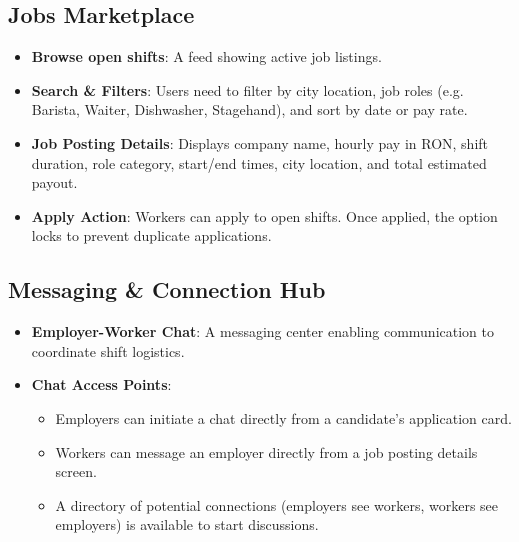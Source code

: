\documentclass{article}
\begin{document}
\subsection{Jobs Marketplace}
\begin{itemize}
    \item \textbf{Browse open shifts}: A feed showing active job listings.
    \item \textbf{Search \& Filters}: Users need to filter by city location, job roles (e.g. Barista, Waiter, Dishwasher, Stagehand), and sort by date or pay rate.
    \item \textbf{Job Posting Details}: Displays company name, hourly pay in RON, shift duration, role category, start/end times, city location, and total estimated payout.
    \item \textbf{Apply Action}: Workers can apply to open shifts. Once applied, the option locks to prevent duplicate applications.
\end{itemize}

\subsection{Messaging \& Connection Hub}
\begin{itemize}
    \item \textbf{Employer-Worker Chat}: A messaging center enabling communication to coordinate shift logistics.
    \item \textbf{Chat Access Points}:
    \begin{itemize}
        \item Employers can initiate a chat directly from a candidate's application card.
        \item Workers can message an employer directly from a job posting details screen.
        \item A directory of potential connections (employers see workers, workers see employers) is available to start discussions.
    \end{itemize}
\end{itemize}
\end{document}
